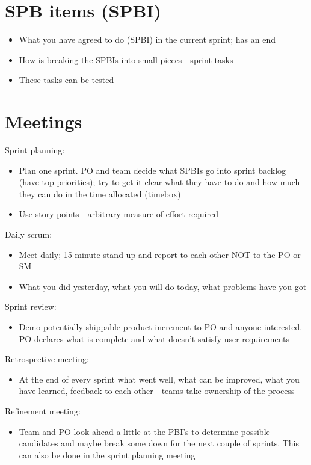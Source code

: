 \documentclass{article}[18pt]
\begin{document}
\section{SPB items (SPBI)}
\begin{itemize}
	\item What you have agreed to do (SPBI) in the current sprint; has an end
	\item How is breaking the SPBIs into small pieces - sprint tasks
	\item These tasks can be tested
\end{itemize}
\section{Meetings}
Sprint planning:
\begin{itemize}
	\item Plan one sprint. PO and team decide what SPBIs go into sprint backlog (have top priorities); try to get it clear what they have to do and how much they can do in the time allocated (timebox)
	\item Use story points - arbitrary measure of effort required
\end{itemize}
Daily scrum:
\begin{itemize}
	\item Meet daily; 15 minute stand up and report to each other NOT to the PO or SM
	\item What you did yesterday, what you will do today, what problems have you got
\end{itemize}
Sprint review:
\begin{itemize}
	\item Demo potentially shippable product increment to PO and anyone interested. PO declares what is complete and what doesn't satisfy user requirements
\end{itemize}
Retrospective meeting:
\begin{itemize}
	\item At the end of every sprint what went well, what can be improved, what you have learned, feedback to each other - teams take ownership of the process
\end{itemize}
Refinement meeting:
\begin{itemize}
	\item Team and PO look ahead a little at the PBI's to determine possible candidates and maybe break some down for the next couple of sprints. This can also be done in the sprint planning meeting
\end{itemize}
\end{document}
